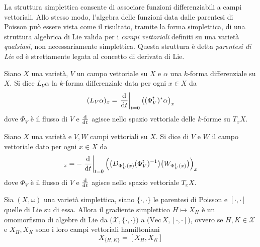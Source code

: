 La struttura simplettica consente di associare funzioni differenziabili a campi vettoriali. Allo stesso modo, l'algebra delle funzioni data dalle parentesi di Poisson può essere vista come il risultato, tramite la forma simplettica, di una struttura algebrica di Lie valida per i \emph{campi vettoriali} definiti su una varietà \emph{qualsiasi}, non necessariamente simplettica. Questa struttura è detta \emph{parentesi di Lie} ed è strettamente legata al concetto di derivata di Lie.
\begin{definition}
  Siano $X$ una varietà, $V$ un campo vettoriale su $X$ e $\alpha$ una $k$-forma differenziale su $X$. Si dice  $L_V\alpha$ la $k$-forma differenziale data per ogni $x \in X$ da \begin{equation*}
  (L_V \alpha)_x = \eval{\dv{t}}_{t=0} \big( (\Phi_V^t)^* \alpha\big)_x
  \end{equation*} 
  dove $\Phi_V$ è il flusso di $V$ e $\dv{t}$ agisce nello spazio vettoriale delle $k$-forme su $T_x X$.
\end{definition}
\begin{definition}
  Siano $X$ una varietà e $V,W$ campi vettoriali su $X$. Si dice  di $V$ e $W$ il campo vettoriale dato per ogni $x \in X$ da \begin{equation*}
  [V,W]_x = - \eval{\dv{t}}_{t=0} \Big(\big(D_{\Phi_V^t(x)} (\Phi_V^t)^{-1}\big)\big(W_{\Phi_V^t(x)}\big) \Big)_x
  \end{equation*}
  dove $\Phi_V$ è il flusso di $V$ e $\dv{t}$ agisce nello spazio vettoriale $T_x X$.
\end{definition}
\begin{theorem}
  Sia $(X, \omega)$ una varietà simplettica, siano $\{\cdot , \cdot \}$ le parentesi di Poisson e $[\cdot , \cdot ]$ quelle di Lie su di essa. Allora il gradiente simplettico $H \mapsto X_H$ è un omomorfismo di algebre di Lie da $\big(\mathcal{X}, \{\cdot , \cdot \} \big)$ a $\big(\mathrm{Vec}\, X, [\cdot , \cdot]\big)$, ovvero se $H,K \in \mathcal{X}$ e $X_H, X_K$ sono i loro campi vettoriali hamiltoniani \begin{equation*}
  X_{\{H,K\}} = [X_H, X_K]
  \end{equation*} 
\end{theorem}

